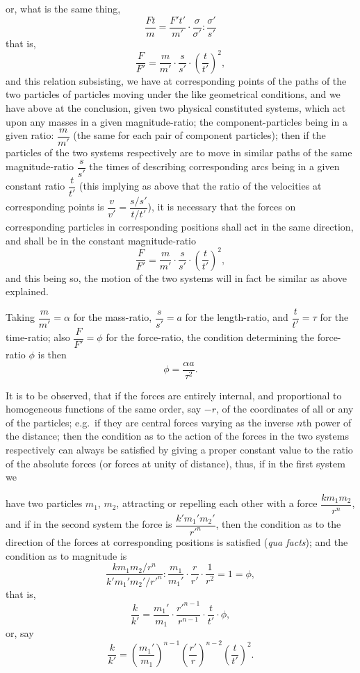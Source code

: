 \documentclass[11pt,a4paper]{book}
\begin{document}
\clearpage

\noindent
or, what is the same thing,
\[
\frac{Ft}{m} = \frac{F't'}{m'} \cdot \frac{\sigma}{\sigma'} : \frac{\sigma'}{s'}
\]
that is,
\[
\frac{F}{F'} = \frac{m}{m'}\cdot\frac{s}{s'}\cdot\left(\frac{t}{t'}\right)^2,
\]
and this relation subsisting, we have at corresponding points of the paths of the two
particles of particles moving under the like geometrical conditions, and we have above
at the conclusion, given two physical constituted systems, which act upon any masses
in a given magnitude-ratio; the component-particles being in a given ratio: $\dfrac{m}{m'}$
(the same for each pair of component particles); then if the particles of the two
systems respectively are to move in similar paths of the same magnitude-ratio $\dfrac{s}{s'}$ the
times of describing corresponding arcs being in a given constant ratio $\dfrac{t}{t'}$ (this implying
as above that the ratio of the velocities at corresponding points is $\dfrac{v}{v'} = \dfrac{s/s'}{t/t'}$), it is
necessary that the forces on corresponding particles in corresponding positions shall act
in the same direction, and shall be in the constant magnitude-ratio
\[
\frac{F}{F'} = \frac{m}{m'}\cdot\frac{s}{s'}\cdot\left(\frac{t}{t'}\right)^2,
\]
and this being so, the motion of the two systems will in fact be similar as above
explained.

Taking $\dfrac{m}{m'} = \alpha$ for the mass-ratio, $\dfrac{s}{s'} = a$ for the length-ratio, and $\dfrac{t}{t'} = \tau$ for the time-ratio; also $\dfrac{F}{F'} = \phi$ for the force-ratio, the condition determining the force-ratio $\phi$
is then
\[
\phi = \frac{\alpha a}{\tau^2}.
\]

It is to be observed, that if the forces are entirely internal, and proportional to
homogeneous functions of the same order, say $-r$, of the coordinates of all or any of
the particles; e.g.\ if they are central forces varying as the inverse $n$th power of the
distance; then the condition as to the action of the forces in the two systems
respectively can always be satisfied by giving a proper constant value to the ratio of
the absolute forces (or forces at unity of distance), thus, if in the first system we

\clearpage

\noindent
have two particles $m_1$, $m_2$, attracting or repelling each other with a force $\dfrac{km_1m_2}{r^n}$, and
if in the second system the force is $\dfrac{k'm_1' m_2'}{r'^n}$, then the condition as to the direction
of the forces at corresponding positions is satisfied (\textit{qua facts}); and the condition as to
magnitude is
\[
\frac{km_1 m_2 / r^n}{k'm_1' m_2'/r'^n} : \frac{m_1}{m_1'} \cdot \frac{r}{r'} \cdot \frac{1}{r^2} = 1 = \phi,
\]
that is,
\[
\frac{k}{k'} = \frac{m_1'}{m_1} \cdot \frac{r'^{n-1}}{r^{n-1}} \cdot \frac{t}{t'} \cdot \phi,
\]
or, say
\[
\frac{k}{k'} = \left(\frac{m_1'}{m_1}\right)^{n-1}\left(\frac{r'}{r}\right)^{n-2}\left(\frac{t}{t'}\right)^2.
\]
\end{document}
